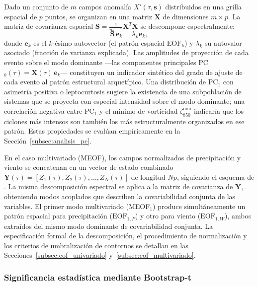 Dado un conjunto de $m$ campos anomalía $X'(\tau, \mathbf{s})$ distribuidos en una grilla espacial de $p$ puntos, se organizan en una matriz $\mathbf{X}$ de dimensiones $m \times p$. La matriz de covarianza espacial $\mathbf{S} = \frac{1}{m-1}\mathbf{X}^T\mathbf{X}$ se descompone espectralmente:
\begin{equation}\label{eq:eof_decomp}
\mathbf{S}\,\mathbf{e}_k = \lambda_k \mathbf{e}_k,
\end{equation}
donde $\mathbf{e}_k$ es el $k$-ésimo autovector (el patrón espacial $\text{EOF}_k$) y $\lambda_k$ su autovalor asociado (fracción de varianza explicada). 
Las amplitudes de proyección de cada evento sobre el modo dominante —las componentes principales PC$_k(\tau) = \mathbf{X}(\tau)\,\mathbf{e}_k$— constituyen un indicador sintético del grado de ajuste de cada evento al patrón estructural arquetípico. 
Una distribución de PC$_1$ con asimetría positiva o leptocurtosis sugiere la existencia de una subpoblación de sistemas que se proyecta con especial intensidad sobre el modo dominante; una correlación negativa entre PC$_1$ y el mínimo de vorticidad $\zeta_{850}^{\min}$ indicaría que los ciclones más intensos son también los más estructuralmente organizados en ese patrón. 
Estas propiedades se evalúan empíricamente en la Sección~\ref{subsec:analisis_pc}.

En el caso multivariado (MEOF), los campos normalizados de precipitación y viento se concatenan en un vector de estado combinado $\mathbf{Y}(\tau) = [Z_1(\tau), Z_2(\tau), \dots, Z_N(\tau)]$ de longitud $Np$, siguiendo el esquema de \citet{bretherton1992intercomparison}. 
La misma descomposición espectral se aplica a la matriz de covarianza de $\mathbf{Y}$, obteniendo modos acoplados que describen la covariabilidad conjunta de las variables. 
El primer modo multivariado (MEOF$_1$) produce simultáneamente un patrón espacial para precipitación ($\text{EOF}_{1,P}$) y otro para viento ($\text{EOF}_{1,W}$), ambos extraídos del mismo modo dominante de covariabilidad conjunta.
La especificación formal de la descomposición, el procedimiento de normalización y los criterios de umbralización de contornos se detallan en las Secciones~\ref{subsec:eof_univariado} y~\ref{subsec:eof_multivariado}.

\subsubsection{Significancia estadística mediante Bootstrap-t}\label{subsubsec:tb_bootstrap}

